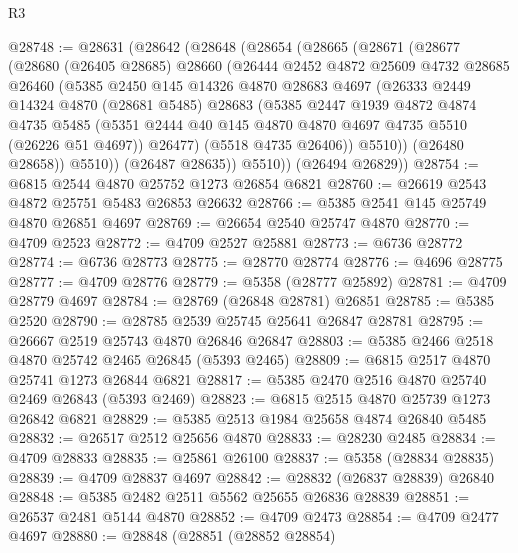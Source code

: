 \begin{lexlean}{R3}
\begin{coremodule}
@28748 := @28631
    (@28642
      (@28648
        (@28654
          (@28665
            (@28671
              (@28677
                (@28680
                  (@26405 @28685)
                  @28660
                  (@26444
                    @2452
                    @4872
                    @25609
                    @4732
                    @28685
                    @26460
                    (@5385
                      @2450
                      @145
                      @14326
                      @4870
                      @28683
                      @4697
                      (@26333
                        @2449
                        @14324
                        @4870
                        (@28681 @5485)
                        @28683
                        (@5385
                          @2447
                          @1939
                          @4872
                          @4874
                          @4735
                          @5485
                          (@5351 @2444 @40 @145 @4870 @4870 @4697 @4735 @5510 (@26226 @51 @4697))
                          @26477)
                        (@5518 @4735 @26406))
                      @5510))
                  (@26480 @28658))
                @5510))
            (@26487 @28635))
          @5510))
      (@26494 @26829))
@28754 := @6815 @2544 @4870 @25752 @1273 @26854 @6821
@28760 := @26619 @2543 @4872 @25751 @5483 @26853 @26632
@28766 := @5385 @2541 @145 @25749 @4870 @26851 @4697
@28769 := @26654 @2540 @25747 @4870
@28770 := @4709 @2523
@28772 := @4709 @2527 @25881
@28773 := @6736 @28772
@28774 := @6736 @28773
@28775 := @28770 @28774
@28776 := @4696 @28775
@28777 := @4709 @28776
@28779 := @5358 (@28777 @25892)
@28781 := @4709 @28779 @4697
@28784 := @28769 (@26848 @28781) @26851
@28785 := @5385 @2520
@28790 := @28785 @2539 @25745 @25641 @26847 @28781
@28795 := @26667 @2519 @25743 @4870 @26846 @26847
@28803 := @5385 @2466 @2518 @4870 @25742 @2465 @26845 (@5393 @2465)
@28809 := @6815 @2517 @4870 @25741 @1273 @26844 @6821
@28817 := @5385 @2470 @2516 @4870 @25740 @2469 @26843 (@5393 @2469)
@28823 := @6815 @2515 @4870 @25739 @1273 @26842 @6821
@28829 := @5385 @2513 @1984 @25658 @4874 @26840 @5485
@28832 := @26517 @2512 @25656 @4870
@28833 := @28230 @2485
@28834 := @4709 @28833
@28835 := @25861 @26100
@28837 := @5358 (@28834 @28835)
@28839 := @4709 @28837 @4697
@28842 := @28832 (@26837 @28839) @26840
@28848 := @5385 @2482 @2511 @5562 @25655 @26836 @28839
@28851 := @26537 @2481 @5144 @4870
@28852 := @4709 @2473
@28854 := @4709 @2477 @4697
@28880 := @28848
    (@28851
      (@28852 @28854)

\end{coremodule}
\end{lexlean}
